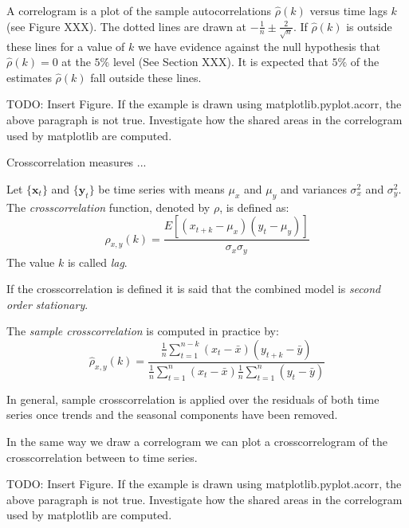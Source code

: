 A correlogram is a plot of the sample autocorrelations $\hat{\rho}(k)$ versus time lags $k$ (see Figure {\color{red} XXX}). The dotted lines are drawn at $-\frac{1}{n}\pm\frac{2}{\sqrt{n}}$. If $\hat{\rho}(k)$ is outside these lines for a value of $k$ we have evidence against the null hypothesis that $\hat{\rho}(k)=0$ at the $5\%$ level (See Section {\color{red} XXX}). It is expected that $5\%$ of the estimates $\hat{\rho}(k)$ fall outside these lines.

\begin{example}
{\color {red} TODO: Insert Figure. If the example is drawn using matplotlib.pyplot.acorr, the above paragraph is not true. Investigate how the shared areas in the correlogram used by matplotlib are computed.}
\end{example}

Crosscorrelation measures ...

\begin{definition}
Let $\{\mathbf{x}_t\}$ and $\{\mathbf{y}_t\}$ be time series with means $\mu_x$ and $\mu_y$ and variances $\sigma_x^2$ and $\sigma_y^2$. The \emph{crosscorrelation} function, denoted by $\rho$, is defined as:
\[
\rho_{x,y}(k) = \frac{E\left[\left(x_{t+k}-\mu_x\right)\left(y_t-\mu_y\right)\right]}{\sigma_x \sigma_y}
\]
The value $k$ is called \emph{lag}.
\end{definition}

If the crosscorrelation is defined it is said that the combined model is \emph{second order stationary}.

The \emph{sample crosscorrelation} is computed in practice by:
\[
\hat{\rho}_{x,y}(k) = \frac{ \frac{1}{n}\sum_{t=1}^{n-k}\left(x_{t}-\bar{x}\right)\left(y_{t+k}-\bar{y}\right) }{ \frac{1}{n}\sum_{t=1}^{n}\left(x_{t}-\bar{x}\right) \frac{1}{n}\sum_{t=1}^{n}\left(y_{t}-\bar{y}\right) }
\]

In general, sample crosscorrelation is applied over the residuals of both time series once trends and the seasonal components have been removed.

In the same way we draw a correlogram we can plot a crosscorrelogram of the crosscorrelation between to time series.

\begin{example}
{\color {red} TODO: Insert Figure. If the example is drawn using matplotlib.pyplot.acorr, the above paragraph is not true. Investigate how the shared areas in the correlogram used by matplotlib are computed.}
\end{example}


